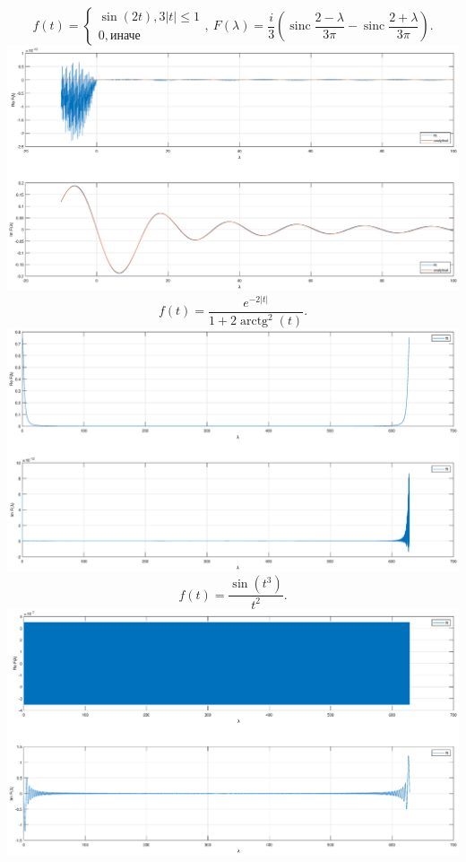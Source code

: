 \documentclass[11pt]{article}
\DeclareMathOperator{\sinc}{sinc}
\DeclareMathOperator{\arctg}{arctg}
\begin{document}
\[ f(t) = \begin{cases} \sin(2t), 3|t| \leq 1\\ 0, \text{иначе} \end{cases},\ F(\lambda) = \frac{i}{3} \left( \sinc\frac{2-\lambda}{3 \pi} - \sinc\frac{2+\lambda}{3 \pi} \right).\]
\includegraphics[width=1\textwidth]{f2.eps}
\[f(t) = \frac{e^{-2|t|}}{1+2\arctg^2(t)}.\]
\includegraphics[width=1\textwidth]{f3.eps}
\newpage
\[f(t) = \frac{\sin(t^3)}{t^2}.\]
\includegraphics[width=1\textwidth]{f4.eps}
\end{document}

